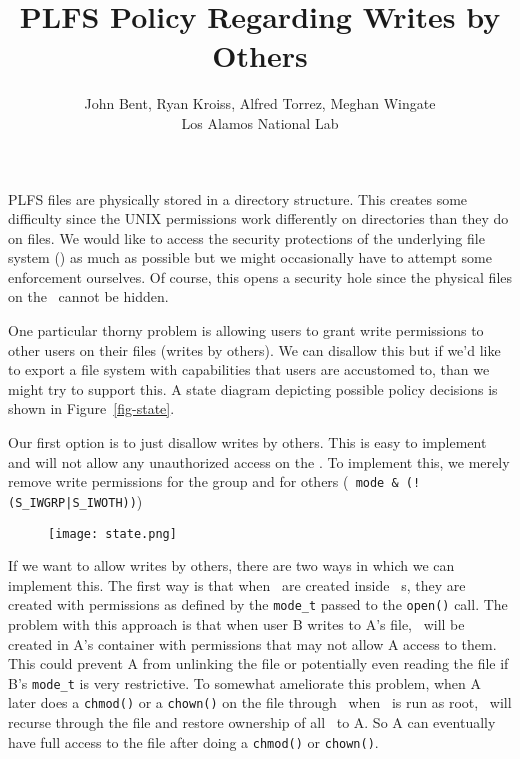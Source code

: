\documentclass[10pt]{article}
\begin{document}
\vspace{-1in}
\title{PLFS Policy Regarding Writes by Others}
\author{
    John Bent,
    Ryan Kroiss,
    Alfred Torrez,
    Meghan Wingate
    \\
    Los Alamos National Lab
}
\fi
\date{}
\maketitle
\thispagestyle{empty}
\pagestyle{empty}
\vspace{-1.5cm}

PLFS files are physically stored in a directory structure.  This creates some
difficulty since the UNIX permissions work differently on directories than they
do on files.  We would like to access the security protections of the 
underlying file system (\store) as much as possible but we might occasionally
have to attempt some enforcement ourselves.  Of course, this opens a security 
hole since the physical files on the \store\ cannot be hidden.  

One particular thorny problem is allowing users to grant write permissions to
other users on their files (writes by others).  We can disallow this but if
we'd like to export a file system with capabilities that users are accustomed
to, than we might try to support this.  A state diagram depicting possible
policy decisions is shown in Figure~\ref{fig-state}.

Our first option is to just disallow writes by others.  This is easy
to implement and will not allow any unauthorized access on the \store.  To
implement this, we merely remove write permissions for the group and
for others ({\tt \ie\ mode \& (!(S\_IWGRP|S\_IWOTH))})

\begin{figure}[h]
\centering
\texttt{[image: state.png]}
\end{figure}

If we want to allow writes by others, there are two ways in which we can 
implement this.  The first way is that when \droppings\ are created inside
\plfs\ {\container}s, they are created with permissions as defined by the 
{\tt mode\_t} passed to the {\tt open()} call.  The problem with this 
approach is that when user B writes to A's file, \droppings\ will be created
in A's container with permissions that may not allow A access to them.
This could prevent A from unlinking the file or potentially even reading the
file if B's {\tt mode\_t} is very restrictive.  To somewhat ameliorate this
problem, when A later does a {\tt chmod()} or a {\tt chown()} on the file 
through \fuse\ when \fuse\ is run as root, \fuse\ will recurse through the
file and restore ownership of all \droppings\ to A.  So A can eventually
have full access to the file after doing a {\tt chmod()} or {\tt chown()}.
\end{document}
